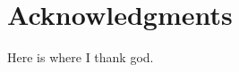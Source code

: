 
\begingroup
\let\clearpage\relax
\let\cleardoublepage\relax
\let\cleardoublepage\relax
\chapter*{Acknowledgments}

Here is where I thank god.

\endgroup
